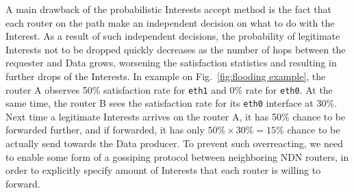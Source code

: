A main drawback of the probabilistic Interests accept method is the fact that each router on the path make an independent decision on what to do with the Interest.
As a result of such independent decisions, the probability of legitimate Interests not to be dropped quickly decreases as the number of hops between the requester and Data grows, worsening the satisfaction statistics and resulting in further drops of the Interests.
In example on Fig.~\ref{fig:flooding example}, the router A observes 50\% satisfaction rate for \texttt{eth1} and 0\% rate for \texttt{eth0}. 
At the same time, the router B sees the satisfaction rate for its \texttt{eth0} interface at 30\%.
Next time a legitimate Interests arrives on the router A, it has 50\% chance to be forwarded further, and if forwarded, it has only $50\% \times 30\% = 15\%$ chance to be actually send towards the Data producer.
To prevent such overreacting, we need to enable some form of a gossiping protocol between neighboring NDN routers, in order to explicitly specify amount of Interests that each router is willing to forward.

